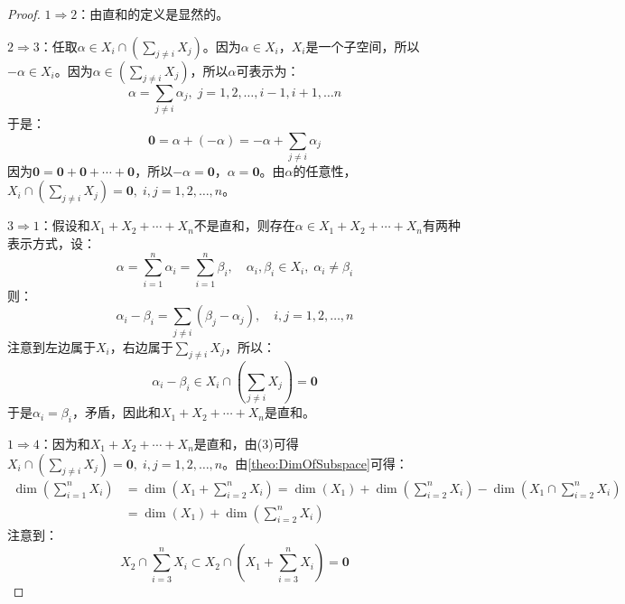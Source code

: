 \begin{proof}
	$1\Rightarrow2$：由直和的定义是显然的。\par
	$2\Rightarrow3$：任取$\alpha\in X_i\cap\left(\sum\limits_{j\ne i}X_j\right)$。因为$\alpha\in X_i$，$X_i$是一个子空间，所以$-\alpha\in X_i$。因为$\alpha\in\left(\sum\limits_{j\ne i}X_j\right)$，所以$\alpha$可表示为：
	\begin{equation*}
		\alpha=\sum_{j\ne i}\alpha_j,\;j=1,2,\dots,i-1,i+1,\dots n
	\end{equation*}
	于是：
	\begin{equation*}
		\mathbf{0}=\alpha+(-\alpha)=-\alpha+\sum_{j\ne i}\alpha_j
	\end{equation*}
	因为$\mathbf{0}=\mathbf{0}+\mathbf{0}+\cdots+\mathbf{0}$，所以$-\alpha=\mathbf{0}$，$\alpha=\mathbf{0}$。由$\alpha$的任意性，$X_i\cap\left(\sum\limits_{j\ne i}X_j\right)=\mathbf{0},\;i,j=1,2,\dots,n$。\par
	$3\Rightarrow1$：假设和$X_1+X_2+\cdots+X_n$不是直和，则存在$\alpha\in X_1+X_2+\cdots+X_n$有两种表示方式，设：
	\begin{equation*}
		\alpha=\sum_{i=1}^{n}\alpha_i=\sum_{i=1}^{n}\beta_i,\quad
		\alpha_i,\beta_i\in X_i,\;\alpha_i\ne\beta_i
	\end{equation*}
	则：
	\begin{equation*}
		\alpha_i-\beta_i=\sum_{j\ne i}(\beta_j-\alpha_j),\quad i,j=1,2,\dots,n
	\end{equation*}
	注意到左边属于$X_i$，右边属于$\sum\limits_{j\ne i}X_j$，所以：
	\begin{equation*}
		\alpha_i-\beta_i\in X_i\cap\left(\sum\limits_{j\ne i}X_j\right)=\mathbf{0}
	\end{equation*}
	于是$\alpha_i=\beta_i$，矛盾，因此和$X_1+X_2+\cdots+X_n$是直和。\par
	$1\Rightarrow4$：因为和$X_1+X_2+\cdots+X_n$是直和，由(3)可得$X_i\cap\left(\sum\limits_{j\ne i}X_j\right)=\mathbf{0},\;i,j=1,2,\dots,n$。由\cref{theo:DimOfSubspace}可得：
	\begin{align*}
		\dim\left(\sum_{i=1}^{n}X_i\right)
		&=\dim\left(X_1+\sum_{i=2}^{n}X_i\right)
		=\dim(X_1)+\dim\left(\sum_{i=2}^{n}X_i\right)-\dim\left(X_1\cap\sum_{i=2}^{n}X_i\right) \\
		&=\dim(X_1)+\dim\left(\sum_{i=2}^{n}X_i\right)
	\end{align*}
	注意到：
	\begin{equation*}
		X_2\cap\sum_{i=3}^{n}X_i\subset X_2\cap\left(X_1+\sum_{i=3}^{n}X_i\right)=\mathbf{0}
	\end{equation*}

\end{proof}
